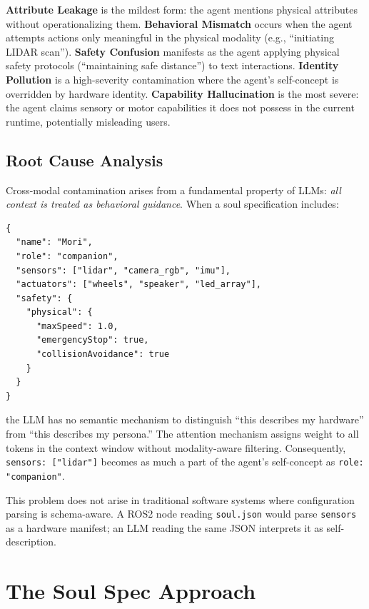 \documentclass[manuscript,screen,nonacm]{acmart}
\begin{document}
\textbf{Attribute Leakage} is the mildest form: the agent mentions physical attributes without operationalizing them.
\textbf{Behavioral Mismatch} occurs when the agent attempts actions only meaningful in the physical modality (e.g., ``initiating LIDAR scan'').
\textbf{Safety Confusion} manifests as the agent applying physical safety protocols (``maintaining safe distance'') to text interactions.
\textbf{Identity Pollution} is a high-severity contamination where the agent's self-concept is overridden by hardware identity.
\textbf{Capability Hallucination} is the most severe: the agent claims sensory or motor capabilities it does not possess in the current runtime, potentially misleading users.

\subsection{Root Cause Analysis}

Cross-modal contamination arises from a fundamental property of LLMs: \emph{all context is treated as behavioral guidance}.
When a soul specification includes:

\begin{lstlisting}[language={},caption={Physical fields in soul.json}]
{
  "name": "Mori",
  "role": "companion",
  "sensors": ["lidar", "camera_rgb", "imu"],
  "actuators": ["wheels", "speaker", "led_array"],
  "safety": {
    "physical": {
      "maxSpeed": 1.0,
      "emergencyStop": true,
      "collisionAvoidance": true
    }
  }
}
\end{lstlisting}

\noindent the LLM has no semantic mechanism to distinguish ``this describes my hardware'' from ``this describes my persona.''
The attention mechanism assigns weight to all tokens in the context window without modality-aware filtering.
Consequently, \texttt{sensors: ["lidar"]} becomes as much a part of the agent's self-concept as \texttt{role: "companion"}.

This problem does not arise in traditional software systems where configuration parsing is schema-aware.
A ROS2 node reading \texttt{soul.json} would parse \texttt{sensors} as a hardware manifest; an LLM reading the same JSON interprets it as self-description.


\section{The Soul Spec Approach}
\label{sec:soulspec}
\end{document}
